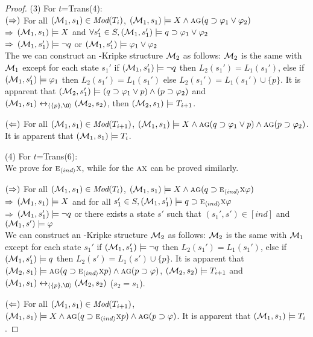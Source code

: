 \documentclass[letterpaper]{article} %
\begin{document}
\begin{proof}
(3) For $t$=Trans(4):\\
$(\Rightarrow)$ For all $({\cal M}_1,s_1) \in \textit{Mod}(T_i)$, \ie $({\cal M}_1,s_1) \models X \wedge \textsc{a}\textsc{g} (q \supset \varphi_1 \vee \varphi_2)$ \\
$\Rightarrow$ $({\cal M}_1,s_1) \models X$ and $\forall s_1'\in S, ({\cal M}_1,s_1') \models q \supset \varphi_1 \vee \varphi_2$\\
$\Rightarrow$ $({\cal M}_1,s_1') \models \neg q$ or $({\cal M}_1,s_1') \models \varphi_1 \vee \varphi_2$\\
The we can construct an \Ind-Kripke structure ${\cal M}_2$ as follows: ${\cal M}_2$ is the same with ${\cal M}_1$ except for each state $s_1'$ if $({\cal M}_1,s_1') \models \neg q$ then $L_2(s_1')= L_1(s_1')$, else if $({\cal M}_1,s_1') \models \varphi_1$ then $L_2(s_1')= L_1(s_1')$ else $L_2(s_1') = L_1(s_1') \cup \{p\}$. It is apparent that $({\cal M}_2,s_1') \models (q\supset \varphi_1 \vee p) \wedge (p \supset \varphi_2)$ and $(\Hm_1, s_1) \lrto_{\tuple{\{p\}, {\O}}} (\Hm_2, s_2)$, then $({\cal M}_2,s_1) \models T_{i+1}$.

$(\Leftarrow)$ For all $({\cal M}_1, s_1) \in \textit{Mod}(T_{i+1})$, \ie $({\cal M}_1,s_1) \models X \wedge \textsc{a}\textsc{g} (q\supset \varphi_1 \vee p) \wedge \textsc{a}\textsc{g}(p \supset \varphi_2)$. It is apparent that $({\cal M}_1, s_1) \models T_i$.


(4) For $t$=Trans(6):\\
We prove for $\textsc{e}_{{\langle{ind}\rangle}} \textsc{x}$, while for the $\textsc{a} \textsc{x}$ can be proved similarly.

$(\Rightarrow)$ For all $({\cal M}_1,s_1) \in \textit{Mod}(T_i)$, \ie $({\cal M}_1,s_1) \models X \wedge \textsc{a}\textsc{g}(q \supset \textsc{e}_{{\langle{ind}\rangle}}\textsc{x} \varphi)$\\
$\Rightarrow$ $({\cal M}_1,s_1) \models X$ and for all $s_1'\in S, ({\cal M}_1,s_1') \models q \supset \textsc{e}_{{\langle{ind}\rangle}} \textsc{x} \varphi$\\
$\Rightarrow$ $({\cal M}_1,s_1') \models \neg q$ or there exists a state $s'$ such that $(s_1', s') \in [ind]$ and $({\cal M}_1,s') \models \varphi$ \\
We can construct an \Ind-Kripke structure ${\cal M}_2$ as follows: ${\cal M}_2$ is the same with ${\cal M}_1$ except for each state $s_1'$ if $({\cal M}_1,s_1') \models \neg q$ then $L_2(s_1')= L_1(s_1')$, else if $({\cal M}_1,s_1') \models q$ then $L_2(s') = L_1(s') \cup \{p\}$. It is apparent that $({\cal M}_2,s_1) \models \textsc{a}\textsc{g}(q\supset \textsc{e}_{{\langle{ind}\rangle}} \textsc{x} p) \wedge \textsc{a}\textsc{g}(p \supset \varphi)$, $({\cal M}_2,s_2) \models T_{i+1}$ and $(\Hm_1, s_1) \lrto_{\tuple{\{p\}, {\O}}} (\Hm_2, s_2)$ ($s_2=s_1$).

 $(\Leftarrow)$ For all $({\cal M}_1, s_1) \in \textit{Mod}(T_{i+1})$, \ie $({\cal M}_1,s_1) \models X \wedge \textsc{a}\textsc{g}(q\supset \textsc{e}_{{\langle{ind}\rangle}} \textsc{x} p) \wedge \textsc{a}\textsc{g}(p \supset \varphi)$. It is apparent that $({\cal M}_1, s_1) \models T_i$.

\end{proof}
\end{document}
